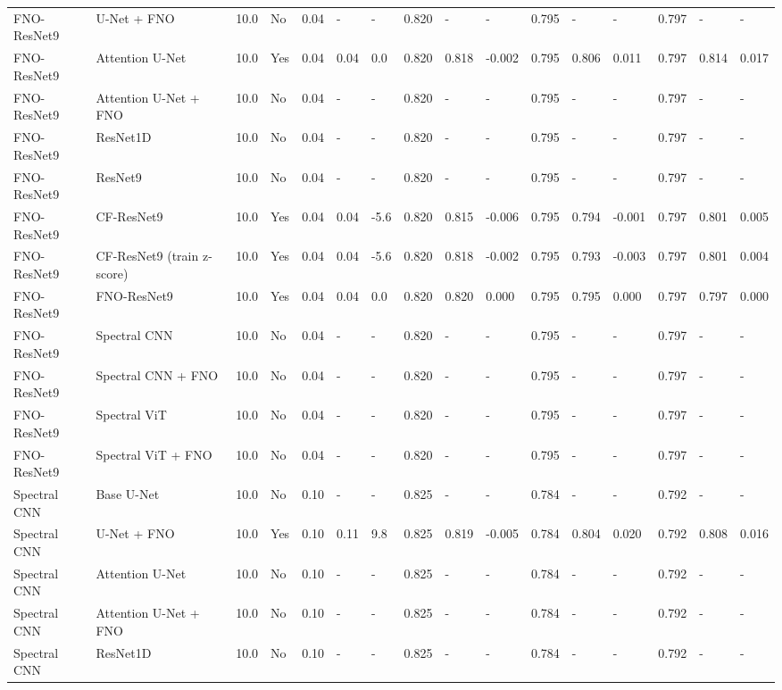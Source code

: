\begin{longtable}{llllllllllllllll}
FNO-ResNet9 & U-Net + FNO & 10.0 & No & 0.04 & - & - & 0.820 & - & - & 0.795 & - & - & 0.797 & - & - \\
FNO-ResNet9 & Attention U-Net & 10.0 & Yes & 0.04 & 0.04 & 0.0 & 0.820 & 0.818 & -0.002 & 0.795 & 0.806 & 0.011 & 0.797 & 0.814 & 0.017 \\
FNO-ResNet9 & Attention U-Net + FNO & 10.0 & No & 0.04 & - & - & 0.820 & - & - & 0.795 & - & - & 0.797 & - & - \\
FNO-ResNet9 & ResNet1D & 10.0 & No & 0.04 & - & - & 0.820 & - & - & 0.795 & - & - & 0.797 & - & - \\
FNO-ResNet9 & ResNet9 & 10.0 & No & 0.04 & - & - & 0.820 & - & - & 0.795 & - & - & 0.797 & - & - \\
FNO-ResNet9 & CF-ResNet9 & 10.0 & Yes & 0.04 & 0.04 & -5.6 & 0.820 & 0.815 & -0.006 & 0.795 & 0.794 & -0.001 & 0.797 & 0.801 & 0.005 \\
FNO-ResNet9 & CF-ResNet9 (train z-score) & 10.0 & Yes & 0.04 & 0.04 & -5.6 & 0.820 & 0.818 & -0.002 & 0.795 & 0.793 & -0.003 & 0.797 & 0.801 & 0.004 \\
FNO-ResNet9 & FNO-ResNet9 & 10.0 & Yes & 0.04 & 0.04 & 0.0 & 0.820 & 0.820 & 0.000 & 0.795 & 0.795 & 0.000 & 0.797 & 0.797 & 0.000 \\
FNO-ResNet9 & Spectral CNN & 10.0 & No & 0.04 & - & - & 0.820 & - & - & 0.795 & - & - & 0.797 & - & - \\
FNO-ResNet9 & Spectral CNN + FNO & 10.0 & No & 0.04 & - & - & 0.820 & - & - & 0.795 & - & - & 0.797 & - & - \\
FNO-ResNet9 & Spectral ViT & 10.0 & No & 0.04 & - & - & 0.820 & - & - & 0.795 & - & - & 0.797 & - & - \\
FNO-ResNet9 & Spectral ViT + FNO & 10.0 & No & 0.04 & - & - & 0.820 & - & - & 0.795 & - & - & 0.797 & - & - \\
Spectral CNN & Base U-Net & 10.0 & No & 0.10 & - & - & 0.825 & - & - & 0.784 & - & - & 0.792 & - & - \\
Spectral CNN & U-Net + FNO & 10.0 & Yes & 0.10 & 0.11 & 9.8 & 0.825 & 0.819 & -0.005 & 0.784 & 0.804 & 0.020 & 0.792 & 0.808 & 0.016 \\
Spectral CNN & Attention U-Net & 10.0 & No & 0.10 & - & - & 0.825 & - & - & 0.784 & - & - & 0.792 & - & - \\
Spectral CNN & Attention U-Net + FNO & 10.0 & No & 0.10 & - & - & 0.825 & - & - & 0.784 & - & - & 0.792 & - & - \\
Spectral CNN & ResNet1D & 10.0 & No & 0.10 & - & - & 0.825 & - & - & 0.784 & - & - & 0.792 & - & - \\

\end{longtable}
